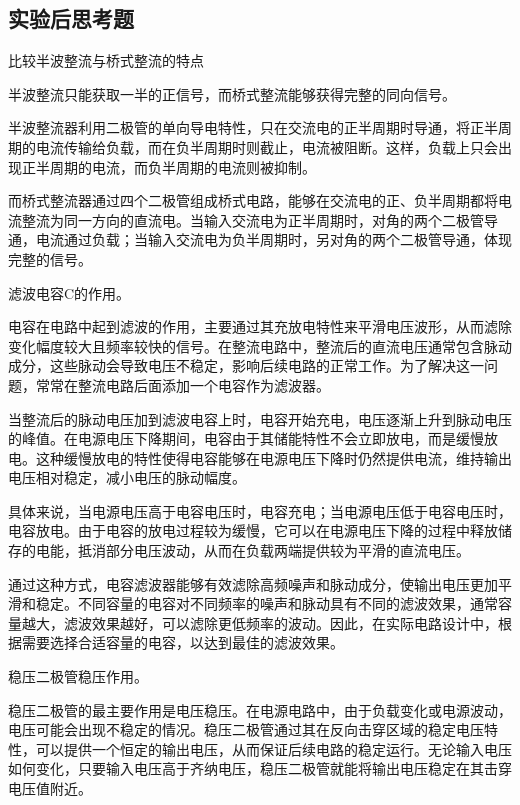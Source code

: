 \documentclass[dvipsnames, svgnames,a4paper,11pt]{article}
\begin{document}
	\subsection{实验后思考题}
	
	\begin{question}
		比较半波整流与桥式整流的特点
	\end{question}
	半波整流只能获取一半的正信号，而桥式整流能够获得完整的同向信号。

	半波整流器利用二极管的单向导电特性，只在交流电的正半周期时导通，将正半周期的电流传输给负载，而在负半周期时则截止，电流被阻断。这样，负载上只会出现正半周期的电流，而负半周期的电流则被抑制。
	
	而桥式整流器通过四个二极管组成桥式电路，能够在交流电的正、负半周期都将电流整流为同一方向的直流电。当输入交流电为正半周期时，对角的两个二极管导通，电流通过负载；当输入交流电为负半周期时，另对角的两个二极管导通，体现完整的信号。
	\begin{question}
		滤波电容C的作用。
	\end{question}
	电容在电路中起到滤波的作用，主要通过其充放电特性来平滑电压波形，从而滤除变化幅度较大且频率较快的信号。在整流电路中，整流后的直流电压通常包含脉动成分，这些脉动会导致电压不稳定，影响后续电路的正常工作。为了解决这一问题，常常在整流电路后面添加一个电容作为滤波器。

当整流后的脉动电压加到滤波电容上时，电容开始充电，电压逐渐上升到脉动电压的峰值。在电源电压下降期间，电容由于其储能特性不会立即放电，而是缓慢放电。这种缓慢放电的特性使得电容能够在电源电压下降时仍然提供电流，维持输出电压相对稳定，减小电压的脉动幅度。

具体来说，当电源电压高于电容电压时，电容充电；当电源电压低于电容电压时，电容放电。由于电容的放电过程较为缓慢，它可以在电源电压下降的过程中释放储存的电能，抵消部分电压波动，从而在负载两端提供较为平滑的直流电压。

通过这种方式，电容滤波器能够有效滤除高频噪声和脉动成分，使输出电压更加平滑和稳定。不同容量的电容对不同频率的噪声和脉动具有不同的滤波效果，通常容量越大，滤波效果越好，可以滤除更低频率的波动。因此，在实际电路设计中，根据需要选择合适容量的电容，以达到最佳的滤波效果。

	\begin{question}
		稳压二极管稳压作用。
	\end{question}
	稳压二极管的最主要作用是电压稳压。在电源电路中，由于负载变化或电源波动，电压可能会出现不稳定的情况。稳压二极管通过其在反向击穿区域的稳定电压特性，可以提供一个恒定的输出电压，从而保证后续电路的稳定运行。无论输入电压如何变化，只要输入电压高于齐纳电压，稳压二极管就能将输出电压稳定在其击穿电压值附近。
	
\end{document}
